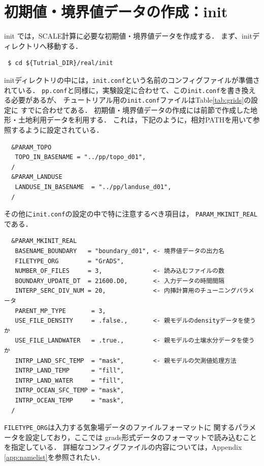 
\section{初期値・境界値データの作成：init}

init では，SCALE計算に必要な初期値・境界値データを作成する．
まず、initディレクトリへ移動する．
\begin{verbatim}
 $ cd ${Tutrial_DIR}/real/init
\end{verbatim}

initディレクトリの中には，\verb|init.conf|という名前のコンフィグファイルが準備されている．
\verb|pp.conf|と同様に，実験設定に合わせて、この\verb|init.conf|を書き換える必要があるが、
チュートリアル用の\verb|init.conf|ファイルはTable\ref{tab:grids}の設定に
すでに合わせてある．
初期値・境界値データの作成には前節で作成した地形・土地利用データを利用する．
これは，下記のように，相対PATHを用いて参照するように設定されている．

\begin{verbatim}
  &PARAM_TOPO
   TOPO_IN_BASENAME = "../pp/topo_d01",
  /
  &PARAM_LANDUSE
   LANDUSE_IN_BASENAME  = "../pp/landuse_d01",
  /
\end{verbatim}
その他に\verb|init.conf|の設定の中で特に注意するべき項目は，
\verb|PARAM_MKINIT_REAL|である．

\begin{verbatim}
  &PARAM_MKINIT_REAL
   BASENAME_BOUNDARY   = "boundary_d01", <- 境界値データの出力名
   FILETYPE_ORG        = "GrADS",
   NUMBER_OF_FILES     = 3,              <- 読み込むファイルの数
   BOUNDARY_UPDATE_DT  = 21600.D0,       <- 入力データの時間間隔
   INTERP_SERC_DIV_NUM = 20,             <- 内挿計算用のチューニングパラメータ
   PARENT_MP_TYPE       = 3,
   USE_FILE_DENSITY     = .false.,       <- 親モデルのdensityデータを使うか
   USE_FILE_LANDWATER   = .true.,        <- 親モデルの土壌水分データを使うか
   INTRP_LAND_SFC_TEMP  = "mask",        <- 親モデルの欠測値処理方法
   INTRP_LAND_TEMP      = "fill",
   INTRP_LAND_WATER     = "fill",
   INTRP_OCEAN_SFC_TEMP = "mask",
   INTRP_OCEAN_TEMP     = "mask",
  /
\end{verbatim}

\verb|FILETYPE_ORG|は入力する気象場データのファイルフォーマットに
関するパラメータを設定しており，ここでは
grads形式データのフォーマットで読み込むことを指定している．
詳細なコンフィグファイルの内容については，Appendix \ref{app:namelist}を参照されたい．


